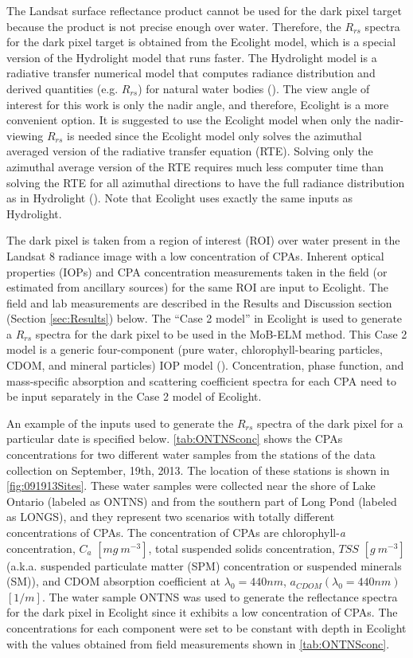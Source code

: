 \documentclass[onecolumn,3p,letterpaper]{elsarticle}
\begin{document}
The Landsat surface reflectance product cannot be used for the dark pixel target because the product is not precise enough over water. Therefore, the $R_{rs}$ spectra for the dark pixel target is obtained from the Ecolight model, which is a special version of the Hydrolight model that runs faster. The Hydrolight model is a radiative transfer numerical model that computes radiance distribution and derived quantities (e.g. $R_{rs}$) for natural water bodies (\cite{MobleyHE}). The view angle of interest for this work is only the nadir angle, and therefore, Ecolight is a more convenient option. It is suggested to use the Ecolight model when only the nadir-viewing $R_{rs}$ is needed since the Ecolight model only solves the azimuthal averaged version of the radiative transfer equation (RTE). Solving only the azimuthal average version of the RTE requires much less computer time than solving the RTE for all azimuthal directions to have the full radiance distribution as in Hydrolight (\cite{MobleyHE}). Note that Ecolight uses exactly the same inputs as Hydrolight.

The dark pixel is taken from a region of interest (ROI) over water present in the Landsat 8 radiance image with a low concentration of CPAs. Inherent optical properties (IOPs) and CPA concentration measurements taken in the field (or estimated from ancillary sources) for the same ROI are input to Ecolight. The field and lab measurements are described in the Results and Discussion section (Section \ref{sec:Results}) below. The ``Case 2 model'' in Ecolight is used to generate a $R_{rs}$ spectra for the dark pixel to be used in the MoB-ELM method. This Case 2 model is a generic four-component (pure water, chlorophyll-bearing particles, CDOM, and mineral particles) IOP model (\cite{MobleyHEtech}). Concentration, phase function, and mass-specific absorption and scattering coefficient spectra for each CPA need to be input separately in the Case 2 model of Ecolight. 

An example of the inputs used to generate the $R_{rs}$ spectra of the dark pixel for a particular date is specified below. \autoref{tab:ONTNSconc} shows the CPAs concentrations for two different water samples from the stations of the data collection on September, 19th, 2013. The location of these stations is shown in \autoref{fig:091913Sites}. These water samples were collected near the shore of Lake Ontario (labeled as ONTNS) and from the southern part of Long Pond (labeled as LONGS), and they represent two scenarios with totally different concentrations of CPAs. The concentration of CPAs are chlorophyll-{\it a} concentration, $C_a$ $[mg~m^{-3}]$, total suspended solids concentration, $TSS$ $[g~m^{-3}]$ (a.k.a. suspended particulate matter (SPM) concentration or suspended minerals (SM)), and CDOM absorption coefficient at $\lambda_0=440nm$, $a_{CDOM}(\lambda_0=440nm)$ $[1/m]$. The water sample ONTNS was used to generate the reflectance spectra for the dark pixel in Ecolight since it exhibits a low concentration of CPAs. The concentrations for each component were set to be constant with depth in Ecolight with the values obtained from field measurements shown in \autoref{tab:ONTNSconc}.
\end{document}
